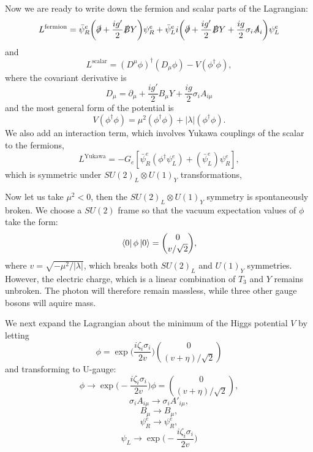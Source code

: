 Now we are ready to write down the fermion and scalar parts of the Lagrangian:
\begin{equation}
L^{\text{fermion}}=\bar{\psi}_R^e\bigg(\slashed{\partial} +\frac{ig'}{2}\slashed{B}Y\bigg)\psi_R^e+\bar{\psi}_L^e i\bigg( \slashed{\partial}+\frac{ig'}{2}\slashed{B}Y+\frac{ig}{2}\sigma_i\slashed{A}_i  \bigg)\psi_{L}^e
\end{equation}
and 
\begin{equation}
L^{\text{scalar}}=(D^\mu \phi)^{\dagger}(D_\mu\phi)-V(\phi^{\dagger}\phi),
\end{equation}
where the covariant derivative is
\begin{equation}
D_\mu =\partial_\mu +\frac{ig'}{2}B_\mu Y +\frac{ig}{2}\sigma_i A_{i\mu }
\end{equation}
and the most general form of the potential is 
\begin{equation}
V(\phi^\dagger\phi)=\mu^2(\phi^\dagger\phi)+|\lambda|(\phi^\dagger\phi).
\end{equation}
We also add an interaction term, which involves Yukawa couplings of the scalar to the fermions,
\begin{equation}
L^{\text{Yukawa}}=-G_e [\bar{\psi}_R^e(\phi^\dagger\psi_{L}^e)+(\bar{\psi}_L^e)\psi_R^e],
\end{equation}
which is symmetric under $SU(2)_L\otimes U(1)_Y$ transformations,

Now let us take $\mu^2<0$, then the $SU(2)_L\otimes U(1)_Y$ symmetry is spontaneously broken.  We choose a $SU(2)$ frame so that the vacuum expectation values of $\phi$ take the form:
\begin{equation}
\bra{0}\phi\ket{0}=\binom{0}{v/\sqrt{2}},
\end{equation}
where $v=\sqrt{-\mu^2/|\lambda|}$, which breaks both $SU(2)_L$ and $U(1)_Y$ symmetries. However, the electric charge, which is a linear combination of $T_3$ and $Y$ remains unbroken. The photon will therefore remain massless, while three other gauge bosons will aquire mass.

We next expand the Lagrangian about the minimum of the Higgs potential $V$ by letting
\begin{equation}
\phi=\exp\bigg(\frac{i\zeta_i\sigma_i}{2v} \bigg)\binom{0}{(v+\eta)/\sqrt{2}}
\end{equation}
and transforming to U-gauge:
\begin{equation}
\phi\to \exp\bigg(-\frac{i\zeta_i\sigma_i}{2v} \bigg)\phi=\binom{0}{(v+\eta)/\sqrt{2}},
\end{equation}
\begin{equation}
\sigma_i A_{i\mu}\to \sigma_i A'_{i\mu},
\end{equation}
\begin{equation}
B_\mu \to B_\mu,
\end{equation}
\begin{equation}
\psi_R^e \to \psi_R^e,
\end{equation}
\begin{equation}
\psi_L \to \exp\bigg(-\frac{i\zeta_i\sigma_i}{2v} \bigg)
\end{equation}

